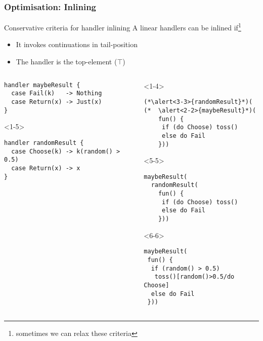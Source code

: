 \documentclass[10pt,compress]{beamer}
\begin{document}
\begin{frame}[fragile]
  \frametitle{Optimisation: Inlining}
  \begin{block}{Conservative criteria for handler inlining}
    A linear handlers can be inlined if\footnote{sometimes we can relax these criteria}
    \begin{itemize}
      \item It invokes continuations in tail-position
      \item The handler is the top-element ($\top$)
    \end{itemize}
  \end{block}
\vfill
\begin{columns}
\begin{column}{0.52\textwidth}
\begin{lstlisting}
handler maybeResult {
  case Fail(k)   -> Nothing
  case Return(x) -> Just(x)
}
\end{lstlisting}

\begin{onlyenv}<1-5>
\begin{lstlisting}
handler randomResult {
  case Choose(k) -> k(random() > 0.5)
  case Return(x) -> x
}
\end{lstlisting}
\end{onlyenv}
\end{column}
\begin{column}{0.48\textwidth}
\begin{onlyenv}<1-4>
\begin{lstlisting}
(*\alert<3-3>{randomResult}*)(
(*  \alert<2-2>{maybeResult}*)(
    fun() {
     if (do Choose) toss()
     else do Fail
    }))
\end{lstlisting}
\end{onlyenv}
\begin{onlyenv}<5-5>
\begin{lstlisting}
maybeResult(
  randomResult(
    fun() {
     if (do Choose) toss()
     else do Fail
    }))
\end{lstlisting}
\end{onlyenv}
\begin{onlyenv}<6-6>
\begin{lstlisting}
maybeResult(
 fun() {
  if (random() > 0.5) 
   toss()[random()>0.5/do Choose]
  else do Fail
 }))
\end{lstlisting}
\end{onlyenv}
\end{column}
\end{columns}


\end{frame}
\end{document}
